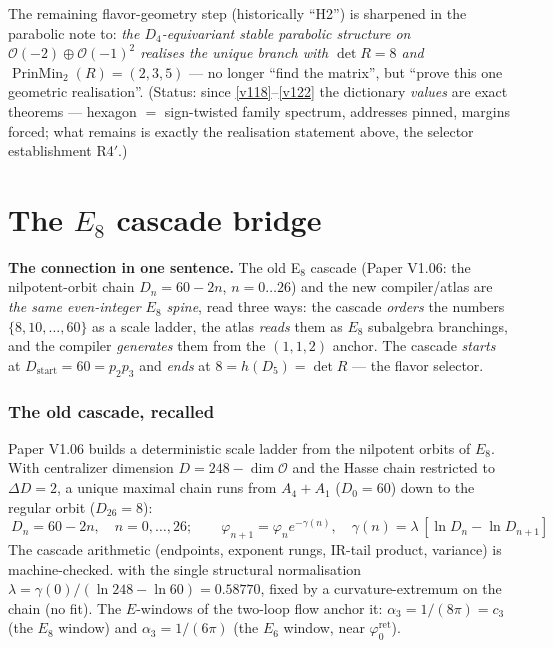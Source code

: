 \documentclass[11pt,a4paper]{article}
\newcommand{\cthree}{c_3}
\newcommand{\phiz}{\varphi_0^{\mathrm{ret}}}
\theoremstyle{definition}
\begin{document}
\noindent The remaining flavor-geometry step (historically ``H2'') is sharpened in the parabolic note to:
\emph{the $D_4$-equivariant stable parabolic structure on $\mathcal O(-2)\oplus\mathcal O(-1)^2$ realises
the unique branch with $\det R=8$ and $\operatorname{PrinMin}_2(R)=(2,3,5)$} --- no longer ``find the
matrix'', but ``prove this one geometric realisation''. (Status: since \vref{v118}--\vref{v122} the dictionary
\emph{values} are exact theorems --- hexagon $=$ sign-twisted family spectrum, addresses pinned, margins
forced; what remains is exactly the realisation statement above, the selector establishment R4$'$.)

\clearpage
\part{The $E_8$ cascade bridge}
\noindent\textbf{The connection in one sentence.}
The old E$_8$ cascade (Paper V1.06: the nilpotent-orbit chain $D_n=60-2n$, $n=0\ldots26$) and the new
compiler/atlas are \emph{the same even-integer $E_8$ spine}, read three ways: the cascade \emph{orders}
the numbers $\{8,10,\dots,60\}$ as a scale ladder, the atlas \emph{reads} them as $E_8$ subalgebra
branchings, and the compiler \emph{generates} them from the $(1,1,2)$ anchor. The cascade \emph{starts}
at $D_{\mathrm{start}}=60=p_2p_3$ and \emph{ends} at $8=h(D_5)=\det R$ --- the flavor selector.

\section{The old cascade, recalled}
Paper V1.06 builds a deterministic scale ladder from the nilpotent orbits of $E_8$. With centralizer
dimension $D=248-\dim\mathcal O$ and the Hasse chain restricted to $\Delta D=2$, a unique maximal chain
runs from $A_4{+}A_1$ ($D_0=60$) down to the regular orbit ($D_{26}=8$):
\[
  \boxed{\ D_n=60-2n,\quad n=0,\dots,26;\qquad \varphi_{n+1}=\varphi_n e^{-\gamma(n)},\quad
  \gamma(n)=\lambda\,[\ln D_n-\ln D_{n+1}]\ }
\]
\noindent The cascade arithmetic (endpoints, exponent rungs, IR-tail product, variance) is
machine-checked.
with the single structural normalisation $\lambda=\gamma(0)/(\ln248-\ln60)=0.58770$, fixed by a
curvature-extremum on the chain (no fit). The $E$-windows of the two-loop flow anchor it: $\alpha_3=1/(8\pi)=\cthree$
(the $E_8$ window) and $\alpha_3=1/(6\pi)$ (the $E_6$ window, near $\phiz$).
\end{document}
